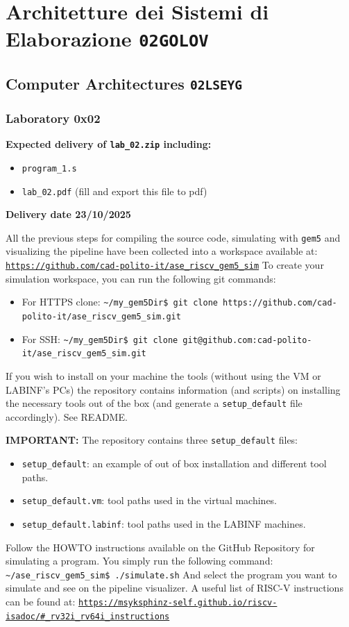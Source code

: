 \documentclass[11pt, a4paper]{article}
\begin{document}
\color{MyBlue}
\section*{Architetture dei Sistemi di Elaborazione \texttt{02GOLOV}}
\subsection*{Computer Architectures \texttt{02LSEYG}}
\subsubsection*{Laboratory 0x02}
\color{black}

\textbf{Expected delivery of \texttt{lab\_02.zip} including:}
\begin{itemize}
    \item \texttt{program\_1.s}
    \item \texttt{lab\_02.pdf} (fill and export this file to pdf)
\end{itemize}
\textbf{Delivery date 23/10/2025}

All the previous steps for compiling the source code, simulating with \texttt{gem5} and visualizing the pipeline have been collected into a workspace available at:
\texttt{\href{https://github.com/cad-polito-it/ase\_riscv\_gem5\_sim}{https://github.com/cad-polito-it/ase\_riscv\_gem5\_sim}}
To create your simulation workspace, you can run the following git commands:
\begin{itemize}
    \item For HTTPS clone: \texttt{\textasciitilde/my\_gem5Dir\$ git clone https://github.com/cad-polito-it/ase\_riscv\_gem5\_sim.git}
    \item For SSH: \texttt{\textasciitilde/my\_gem5Dir\$ git clone git@github.com:cad-polito-it/ase\_riscv\_gem5\_sim.git}
\end{itemize}
If you wish to install on your machine the tools (without using the VM or LABINF’s PCs) the repository contains information (and scripts) on installing the necessary tools out of the box (and generate a \texttt{setup\_default} file accordingly). See README.

\textbf{IMPORTANT:} The repository contains three \texttt{setup\_default} files:
\begin{itemize}
    \item \texttt{setup\_default}: an example of out of box installation and different tool paths.
    \item \texttt{setup\_default.vm}: tool paths used in the virtual machines.
    \item \texttt{setup\_default.labinf}: tool paths used in the LABINF machines.
\end{itemize}
Follow the HOWTO instructions available on the GitHub Repository for simulating a program. You simply run the following command: \texttt{\textasciitilde/ase\_riscv\_gem5\_sim\$ ./simulate.sh}
And select the program you want to simulate and see on the pipeline visualizer.
A useful list of RISC-V instructions can be found at:
\texttt{\href{https://msyksphinz-self.github.io/riscv-isadoc/\#\_rv32i\_rv64i\_instructions}{https://msyksphinz-self.github.io/riscv-isadoc/\#\_rv32i\_rv64i\_instructions}}
\end{document}
